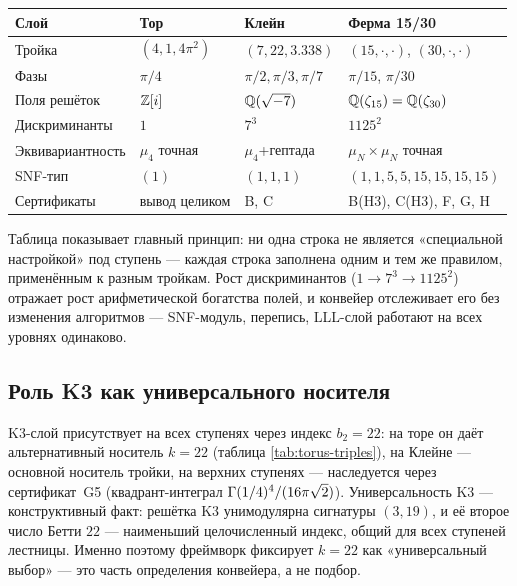\begin{center}
\small
\begin{tabularx}{\textwidth}{@{}>{\raggedright\arraybackslash}p{2.5cm}
  >{\raggedright\arraybackslash}X
  >{\raggedright\arraybackslash}X
  >{\raggedright\arraybackslash}X@{}}
\toprule
Слой & Тор & Клейн & Ферма 15/30 \\
\midrule
Тройка & $(4,1,4\pi^2)$ & $(7,22,3.338)$ &
  $(15,\cdot,\cdot)$, $(30,\cdot,\cdot)$ \\
Фазы & $\pi/4$ & $\pi/2,\pi/3,\pi/7$ & $\pi/15$, $\pi/30$ \\
Поля решёток & $\mathbb{Z}[i]$ & $\mathbb{Q}(\sqrt{-7})$ &
  $\mathbb{Q}(\zeta_{15})=\mathbb{Q}(\zeta_{30})$ \\
Дискриминанты & $1$ & $7^3$ & $1125^2$ \\
Эквивариантность & $\mu_4$ точная & $\mu_4$+гептада &
  $\mu_N\times\mu_N$ точная \\
SNF-тип & $(1)$ & $(1,1,1)$ &
  $(1,1,5,5,15,15,15,15)$ \\
Сертификаты & вывод целиком & B, C & B(H3), C(H3), F, G, H \\
\bottomrule
\end{tabularx}
\end{center}

Таблица показывает главный принцип: ни одна строка не является
«специальной настройкой» под ступень --- каждая строка заполнена
одним и тем же правилом, применённым к разным тройкам. Рост
дискриминантов ($1\to7^3\to1125^2$) отражает рост арифметической
богатства полей, и конвейер отслеживает его без изменения
алгоритмов --- SNF-модуль, перепись, LLL-слой работают на всех
уровнях одинаково.

\subsection{Роль K3 как универсального носителя}

K3-слой присутствует на всех ступенях через индекс $b_2=22$: на
торе он даёт альтернативный носитель $k=22$ (таблица
\ref{tab:torus-triples}), на Клейне --- основной носитель тройки,
на верхних ступенях --- наследуется через сертификат~G5
(квадрант-интеграл $\Gamma(1/4)^4/(16\pi\sqrt2)$). Универсальность
K3 --- конструктивный факт: решётка K3 унимодулярна сигнатуры
$(3,19)$, и её второе число Бетти $22$ --- наименьший
целочисленный индекс, общий для всех ступеней лестницы. Именно
поэтому фреймворк фиксирует $k=22$ как «универсальный выбор» ---
это часть определения конвейера, а не подбор.

